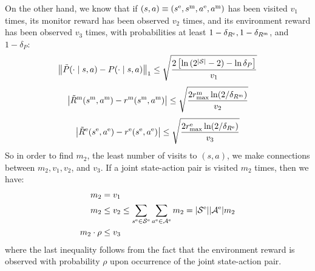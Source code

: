 On the other hand, we know that if $(s, a) \equiv (s^\text{e}, s^\text{m}, a^\text{e}, a^\text{m})$ has been visited $v_1$ times, its monitor reward has been observed $v_2$ times, and its environment reward has been observed $v_3$ times, with probabilities at least $1 - \delta_{R^\text{e}}, 1 - \delta_{R^\text{m}}$, and $1 - \delta_P$:
%
\begin{equation}
\label{eq:exploit_tau_p}
    \left \lVert \tilde{P}(\cdot \mid s, a) - P(\cdot \mid s, a) \right \rVert_1 
    \leq \sqrt{\frac{2\left[\ln{(2^{|\mathcal{S}|} - 2) - \ln{\delta_P}}\right]}{v_1}}
\end{equation}
%
\begin{equation}
\label{eq:exploit_tau_rmon}
    \left \lvert \tilde{R}^\text{m}(s^\text{m}, a^\text{m}) - r^\text{m}(s^\text{m}, a^\text{m}) \right \rvert \leq \sqrt{\frac{2r_{\text{max}}^\text{m}\ln(2/\delta_{R^\text{m}})}{v_2}}
\end{equation}
%
\begin{equation}
\label{eq:exploit_tau_renv}
    \left \lvert \tilde{R}^\text{e}(s^\text{e}, a^\text{e}) - r^\text{e}(s^\text{e}, a^\text{e}) \right \rvert \leq \sqrt{\frac{2r_{\text{max}}^\text{e}\ln(2/\delta_{R^\text{e}})}{v_3}}
\end{equation}
%
So in order to find $m_2$, the least number of visits to $(s, a)$, we make connections between $m_2, v_1, v_2$, and $v_3$. If a joint state-action pair is visited $m_2$ times, then we have:
%
\begin{align*}
    m_2 & = v_1 \\
    m_2 & \leq v_2 \leq \sum_{s^\text{e} \in \mathcal{S}^\text{e}}\sum_{a^\text{e} \in \mathcal{A}^\text{e}} m_2 = |\mathcal{S}^\text{e}||\mathcal{A}^\text{e}|m_2 \\
    m_2\cdot\rho &\leq v_3
\end{align*}
%
where the last inequality follows from the fact that the environment reward is observed with probability  $\rho$ upon occurrence of the joint state-action pair. 


